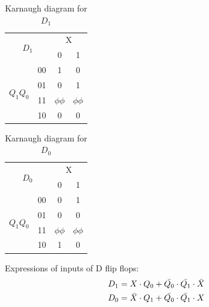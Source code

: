 \documentclass[pdftex,12pt,a4paper]{article}
\begin{document}
\begin{table}[h]
\centering
\begin{tabular}{cc|cc}
\multicolumn{2}{c|}{\multirow{2}{*}{$D_{1}$}} & \multicolumn{2}{c}{X}   \\
\multicolumn{2}{c|}{}                         & 0          & 1          \\ \hline
\multirow{4}{*}{$Q_{1}Q_{0}$}       & 00      & 1          & 0          \\
                                    & 01      & 0          & 1          \\
                                    & 11      & $\phi\phi$ & $\phi\phi$ \\
                                    & 10      & 0          & 0         
\end{tabular}
\caption{Karnaugh diagram for $D_{1}$}
\label{tab:part2_d}
\end{table}

\begin{table}[h]
\centering
\begin{tabular}{cc|cc}
\multicolumn{2}{c|}{\multirow{2}{*}{$D_{0}$}} & \multicolumn{2}{c}{X}   \\
\multicolumn{2}{c|}{}                         & 0          & 1          \\ \hline
\multirow{4}{*}{$Q_{1}Q_{0}$}       & 00      & 0          & 1          \\
                                    & 01      & 0          & 0          \\
                                    & 11      & $\phi\phi$ & $\phi\phi$ \\
                                    & 10      & 1          & 0         
\end{tabular}
\caption{Karnaugh diagram for $D_{0}$}
\label{tab:part2_d}
\end{table}


Expressions of inputs of D flip flops:
\begin{align}
    D_{1} &= X \cdot Q_{0} + \bar{Q_{0}} \cdot \bar{Q_{1}} \cdot \bar{X} \notag \\
    D_{0} &= \bar{X} \cdot Q_{1} + \bar{Q_{0}} \cdot \bar{Q_{1}} \cdot X \notag \\
\end{align}




\end{document}
